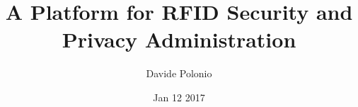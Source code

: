 \documentclass{beamer}
\title{A Platform for RFID Security and Privacy Administration}
\author{Davide Polonio}
\date{Jan 12 2017}
\institute{University of Padova}
\begin{document}
\graphicspath{{res/image/}}


\end{document}
